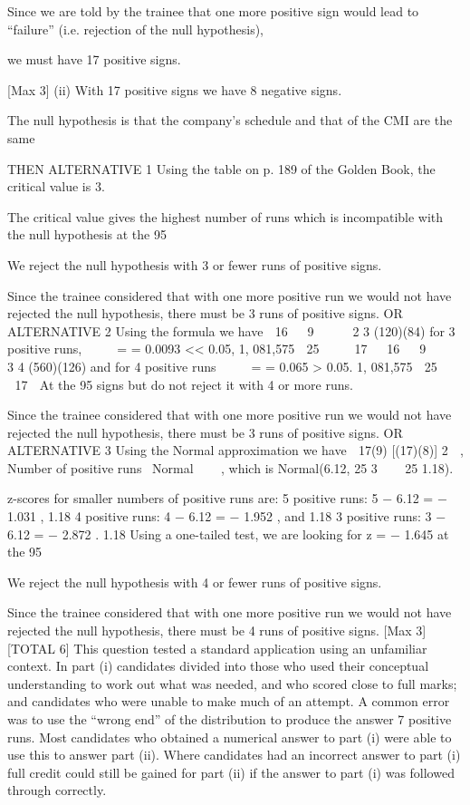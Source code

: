 \documentclass[a4paper,12pt]{article}
\begin{document}
Since we are told by the trainee that one more positive sign would lead to
“failure” (i.e. rejection of the null hypothesis),

we must have 17 positive signs.

[Max 3]
(ii)
With 17 positive signs we have 8 negative signs.

The null hypothesis is that the company’s schedule and that of the CMI are the
same

THEN ALTERNATIVE 1
Using the table on p. 189 of the Golden Book,
the critical value is 3.


The critical value gives the highest number of runs which is incompatible with
the null hypothesis at the 95%

We reject the null hypothesis with 3 or fewer runs of positive signs.

Since the trainee considered that with one more positive run we would not
have rejected the null hypothesis, there must be 3 runs of positive signs. 
OR ALTERNATIVE 2
Using the formula we have
 16   9 
  
2 3
(120)(84)
for 3 positive runs,     =
= 0.0093 << 0.05,
1, 081,575
 25 
 
 17  
 16   9 
  
3 4
(560)(126)
and for 4 positive runs     =
= 0.065 > 0.05.
1, 081,575
 25 
 
 17  
At the 95%
signs but do not reject it with 4 or more runs.

Since the trainee considered that with one more positive run we would not
have rejected the null hypothesis, there must be 3 runs of positive signs. 
OR ALTERNATIVE 3
Using the Normal approximation we have
 17(9) [(17)(8)] 2 
,
Number of positive runs ~Normal  
 , which is Normal(6.12,
25 3  
 25
1.18).

z-scores for smaller numbers of positive runs are:
5 positive runs: 5 − 6.12
= − 1.031 ,
1.18
4 positive runs: 4 − 6.12
= − 1.952 , and
1.18
3 positive runs: 3 − 6.12
= − 2.872 .
1.18
Using a one-tailed test, we are looking for z = − 1.645 at the 95%

We reject the null hypothesis with 4 or fewer runs of positive signs.

Since the trainee considered that with one more positive run we would not
have rejected the null hypothesis, there must be 4 runs of positive signs. 
[Max 3]
[TOTAL 6]
This question tested a standard application using an unfamiliar context. In
part (i) candidates divided into those who used their conceptual
understanding to work out what was needed, and who scored close to full
marks; and candidates who were unable to make much of an attempt. A
common error was to use the “wrong end” of the distribution to produce the
answer 7 positive runs. Most candidates who obtained a numerical answer to
part (i) were able to use this to answer part (ii). Where candidates had an
incorrect answer to part (i) full credit could still be gained for part (ii) if the
answer to part (i) was followed through correctly.
\end{document}
